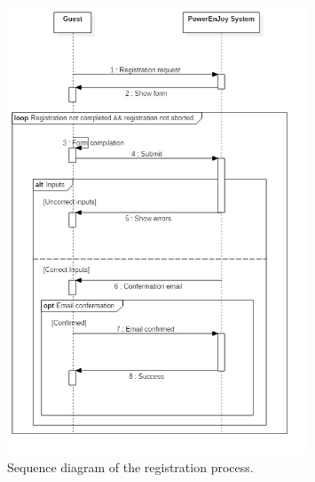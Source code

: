 \begin{figure}[H]
	\begin{center}
		\includegraphics[width=0.8\textwidth]{sequence_diagram/Registration.jpg}
		\caption{Sequence diagram of the registration process.}
	\end{center}
\end{figure}


